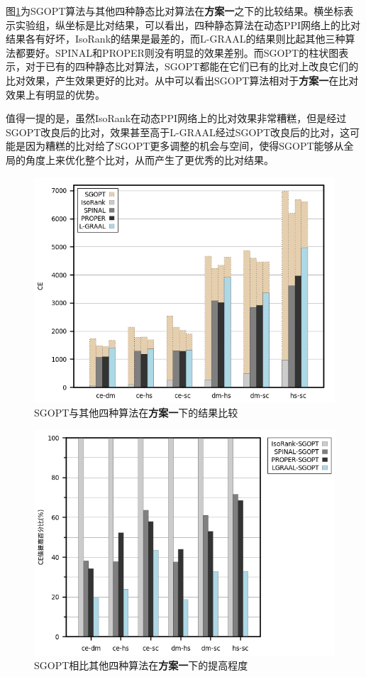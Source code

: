 图\ref{fig:all}为SGOPT算法与其他四种静态比对算法在\textbf{方案一}之下的比较结果。横坐标表示实验组，纵坐标是比对结果，可以看出，四种静态算法在动态PPI网络上的比对结果各有好坏，IsoRank的结果是最差的，而L-GRAAL的结果则比起其他三种算法都要好。SPINAL和PROPER则没有明显的效果差别。而SGOPT的柱状图表示，对于已有的四种静态比对算法，SGOPT都能在它们已有的比对上改良它们的比对效果，产生效果更好的比对。从中可以看出SGOPT算法相对于\textbf{方案一}在比对效果上有明显的优势。

值得一提的是，虽然IsoRank在动态PPI网络上的比对效果非常糟糕，但是经过SGOPT改良后的比对，效果甚至高于L-GRAAL经过SGOPT改良后的比对，这可能是因为糟糕的比对给了SGOPT更多调整的机会与空间，使得SGOPT能够从全局的角度上来优化整个比对，从而产生了更优秀的比对结果。

\begin{figure}[htbp]
\centering
\includegraphics[height=0.25\textheight]{pic/all.png}
\caption{SGOPT与其他四种算法在\textbf{方案一}下的结果比较} 
\label{fig:all}
\end{figure}

\begin{figure}[htbp]
\centering
\includegraphics[height=0.25\textheight]{pic/all_improve.png}
\caption{SGOPT相比其他四种算法在\textbf{方案一}下的提高程度} 
\label{fig:all_improve}
\end{figure}

